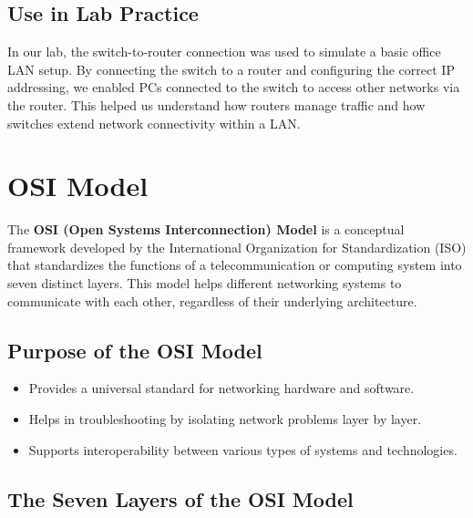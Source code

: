 \documentclass[12pt]{article}
\begin{document}
\subsection{Use in Lab Practice}
In our lab, the switch-to-router connection was used to simulate a basic office LAN setup. By connecting the switch to a router and configuring the correct IP addressing, we enabled PCs connected to the switch to access other networks via the router. This helped us understand how routers manage traffic and how switches extend network connectivity within a LAN.

\newpage

\section{OSI Model}
The \textbf{OSI (Open Systems Interconnection) Model} is a conceptual framework developed by the International Organization for Standardization (ISO) that standardizes the functions of a telecommunication or computing system into seven distinct layers. This model helps different networking systems to communicate with each other, regardless of their underlying architecture.

\subsection{Purpose of the OSI Model}
\begin{itemize}
    \item Provides a universal standard for networking hardware and software.
    \item Helps in troubleshooting by isolating network problems layer by layer.
    \item Supports interoperability between various types of systems and technologies.
\end{itemize}

\subsection{The Seven Layers of the OSI Model}
\end{document}
